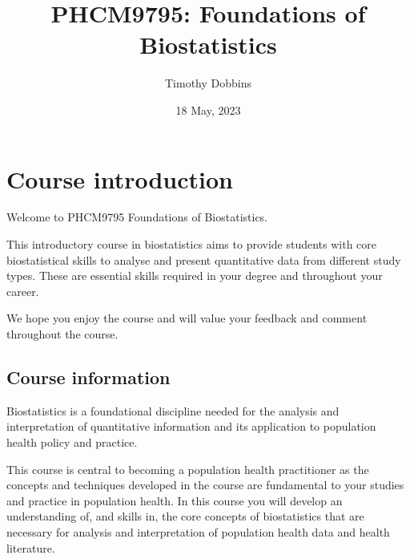 \documentclass[
  a4paper,
]{memoir}
\title{PHCM9795: Foundations of Biostatistics}
\author{Timothy Dobbins}
\date{18 May, 2023}
\renewcommand*\contentsname{Table of contents}
\newcommand\contentsname{Table of contents}
\begin{document}
\frontmatter
\maketitle
\ifdefined\Shaded\renewenvironment{Shaded}{\begin{tcolorbox}[sharp corners, borderline west={3pt}{0pt}{shadecolor}, interior hidden, enhanced, frame hidden, boxrule=0pt, breakable]}{\end{tcolorbox}}\fi

\renewcommand*\contentsname{Table of contents}
{
\hypersetup{linkcolor=}
\setcounter{tocdepth}{2}
\tableofcontents
}
\mainmatter
{}

\hypertarget{course-introduction}{%
\chapter*{Course introduction}\label{course-introduction}}


Welcome to PHCM9795 Foundations of Biostatistics.

This introductory course in biostatistics aims to provide students with
core biostatistical skills to analyse and present quantitative data from
different study types. These are essential skills required in your
degree and throughout your career.

We hope you enjoy the course and will value your feedback and comment
throughout the course.

\hypertarget{course-information}{%
\section*{Course information}\label{course-information}}


Biostatistics is a foundational discipline needed for the analysis and
interpretation of quantitative information and its application to
population health policy and practice.

This course is central to becoming a population health practitioner as
the concepts and techniques developed in the course are fundamental to
your studies and practice in population health. In this course you will
develop an understanding of, and skills in, the core concepts of
biostatistics that are necessary for analysis and interpretation of
population health data and health literature.
\end{document}
